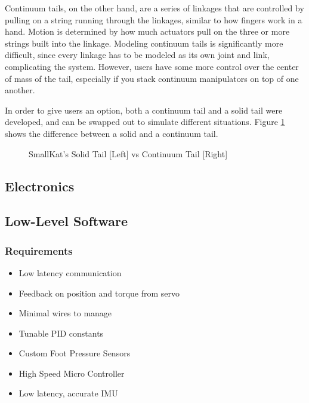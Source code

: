                 Continuum tails, on the other hand, are a series of linkages that are controlled by pulling on a string running through the linkages, similar to how fingers work in a hand. Motion is determined by how much actuators pull on the three or more strings built into the linkage. Modeling continuum tails is significantly more difficult, since every linkage has to be modeled as its own joint and link, complicating the system. However, users have some more control over the center of mass of the tail, especially if you stack continuum manipulators on top of one another.

                In order to give users an option, both a continuum tail and a solid tail were developed, and can be swapped out to simulate different situations. Figure \ref{fig:TailComparison} shows the difference between a solid and a continuum tail.
                
                \begin{figure}[H]
                    \centering

                    \caption{SmallKat's Solid Tail [Left] vs Continuum Tail [Right]}
                    \label{fig:TailComparison}
                \end{figure}

        
    
    \subsection{Electronics}


    \subsection{Low-Level Software}
    \subsubsection{Requirements}
    \begin{itemize} %
        \item Low latency communication
        \item Feedback on position and torque from servo
        \item Minimal wires to manage
        \item Tunable PID constants
        \item Custom Foot Pressure Sensors
        \item High Speed Micro Controller
        \item Low latency, accurate IMU
    \end{itemize}

